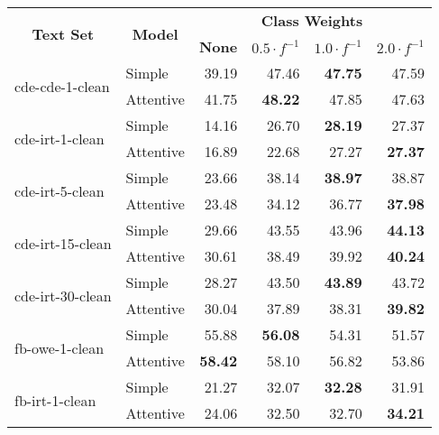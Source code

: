 \begin{tabular}{| l | l | r | r | r | r |}
    \hline

    \multicolumn{1}{|c|}{\multirow{2}{*}{\textbf{Text Set}}} &
    \multicolumn{1}{|c|}{\multirow{2}{*}{\textbf{Model}}} &
    \multicolumn{4}{|c|}{\textbf{Class Weights}} \\

    &
    &
    \multicolumn{1}{|c|}{\textbf{None}} &
    \multicolumn{1}{|c|}{\textbf{$0.5 \cdot f^{-1}$}} &
    \multicolumn{1}{|c|}{\textbf{$1.0 \cdot f^{-1}$}} &
    \multicolumn{1}{|c|}{\textbf{$2.0 \cdot f^{-1}$}} \\

    \hline \hline

    \multirow{2}{*}{cde-cde-1-clean}
    & Simple    & 39.19 & 47.46 & \textbf{47.75} & 47.59 \\
    & Attentive & 41.75 & \textbf{48.22} & 47.85 & 47.63 \\ \hline

    \multirow{2}{*}{cde-irt-1-clean}
    & Simple    & 14.16 & 26.70 & \textbf{28.19} & 27.37 \\
    & Attentive & 16.89 & 22.68 & 27.27 & \textbf{27.37} \\ \hline

    \multirow{2}{*}{cde-irt-5-clean}
    & Simple    & 23.66 & 38.14 & \textbf{38.97} & 38.87 \\
    & Attentive & 23.48 & 34.12 & 36.77 & \textbf{37.98} \\ \hline

    \multirow{2}{*}{cde-irt-15-clean}
    & Simple    & 29.66 & 43.55 & 43.96 & \textbf{44.13} \\
    & Attentive & 30.61 & 38.49 & 39.92 & \textbf{40.24} \\ \hline

    \multirow{2}{*}{cde-irt-30-clean}
    & Simple    & 28.27 & 43.50 & \textbf{43.89} & 43.72 \\
    & Attentive & 30.04 & 37.89 & 38.31 & \textbf{39.82} \\ \hline \hline

    \multirow{2}{*}{fb-owe-1-clean}
    & Simple    & 55.88 & \textbf{56.08} & 54.31 & 51.57 \\
    & Attentive & \textbf{58.42} & 58.10 & 56.82 & 53.86 \\ \hline

    \multirow{2}{*}{fb-irt-1-clean}
    & Simple    & 21.27 & 32.07 & \textbf{32.28} & 31.91 \\
    & Attentive & 24.06 & 32.50 & 32.70 & \textbf{34.21} \\ \hline


\end{tabular}
